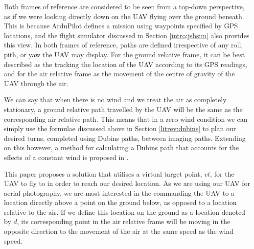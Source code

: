 Both frames of reference are considered to be seen from a top-down perspective, as if we were looking directly down on the UAV flying over the ground beneath. This is because ArduPilot defines a mission using waypoints specified by GPS locations, and the flight simulator discussed in Section \ref{intro:jsbsim} also provides this view. In both frames of reference, paths are defined irrespective of any roll, pith, or yaw the UAV may display. For the ground relative frame, it can be best described as the tracking the location of the UAV according to its GPS readings, and for the air relative frame as the movement of the centre of gravity of the UAV through the air. 

We can say that when there is no wind and we treat the air as completely stationary, a ground relative path travelled by the UAV will be the same as the corresponding air relative path. This means that in a zero wind condition we can simply use the formulae discussed above in Section \ref{litrev:dubins} to plan our desired turns, completed using Dubins paths, between imaging paths. Extending on this however, a method for calculating a Dubins path that accounts for the effects of a constant wind is proposed in \cite{mcgee2005optimal}.

This paper proposes a solution that utilises a virtual target point, $vt$, for the UAV to fly to in order to reach our desired location. As we are using our UAV for aerial photography, we are most interested in the commanding the UAV to a location directly above a point on the ground below, as opposed to a location relative to the air. If we define this location on the ground as a location denoted by $d$, its corresponding point in the air relative frame will be moving in the opposite direction to the movement of the air at the same speed as the wind speed. 


